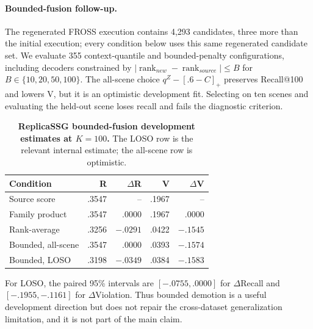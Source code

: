 \paragraph{Bounded-fusion follow-up.}
The regenerated FROSS execution contains 4,293 candidates, three more than the
initial execution; every condition below uses this same regenerated candidate
set. We evaluate 355 context-quantile and bounded-penalty configurations,
including decoders constrained by
$|\operatorname{rank}_{new}-\operatorname{rank}_{source}|\le B$ for
$B\in\{10,20,50,100\}$. The all-scene choice
$q^Z-[.6-C]_+$ preserves Recall@100 and lowers V, but it is an optimistic
development fit. Selecting on ten scenes and evaluating the held-out scene
loses recall and fails the diagnostic criterion.

\begin{table}[H]
\centering
\scriptsize
\setlength{\tabcolsep}{3pt}
\caption{\textbf{ReplicaSSG bounded-fusion development estimates at $K=100$.}
The LOSO row is the relevant internal estimate; the all-scene row is optimistic.}
\label{tab:replica-bounded}
\begin{tabular}{lrrrr}
\toprule
Condition & R & $\Delta$R & V & $\Delta$V \\
\midrule
Source score & .3547 & -- & .1967 & -- \\
Family product & .3547 & .0000 & .1967 & .0000 \\
Rank-average & .3256 & $-.0291$ & .0422 & $-.1545$ \\
Bounded, all-scene & .3547 & .0000 & .0393 & $-.1574$ \\
Bounded, LOSO & .3198 & $-.0349$ & .0384 & $-.1583$ \\
\bottomrule
\end{tabular}
\end{table}

For LOSO, the paired 95\% intervals are $[-.0755,.0000]$ for
$\Delta$Recall and $[-.1955,-.1161]$ for $\Delta$Violation. Thus bounded
demotion is a useful development direction but does not repair the
cross-dataset generalization limitation, and it is not part of the main claim.
